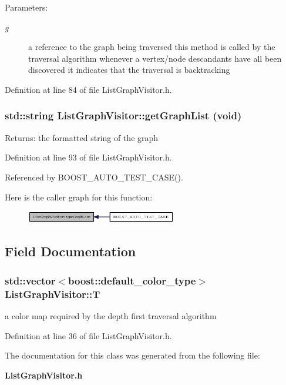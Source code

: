 \begin{Desc}
\item[Parameters:]
\begin{description}
\item[{\em g}]a reference to the graph being traversed this method is called by the traversal algorithm whenever a vertex/node descandants have all been discovered it indicates that the traversal is backtracking \end{description}
\end{Desc}


Definition at line 84 of file ListGraphVisitor.h.
\subsubsection{\setlength{\rightskip}{0pt plus 5cm}std::string ListGraphVisitor::getGraphList (void)\hspace{0.3cm}{\tt  [inline]}}\label{classListGraphVisitor_46a6ec7ac2284375c4ec816b5855c871}


\begin{Desc}
\item[Returns:]the formatted string of the graph \end{Desc}




Definition at line 93 of file ListGraphVisitor.h.

Referenced by BOOST\_\-AUTO\_\-TEST\_\-CASE().

Here is the caller graph for this function:\nopagebreak
\begin{figure}[H]
\begin{center}
\leavevmode
\includegraphics[width=186pt]{classListGraphVisitor_46a6ec7ac2284375c4ec816b5855c871_icgraph}
\end{center}
\end{figure}


\subsection{Field Documentation}
\subsubsection{\setlength{\rightskip}{0pt plus 5cm}std::vector$<$boost::default\_\-color\_\-type$>$ {\bf ListGraphVisitor::T}}\label{classListGraphVisitor_f0dbe8c9976400feef04e5cac95d0df1}


a color map required by the depth first traversal algorithm 



Definition at line 36 of file ListGraphVisitor.h.

The documentation for this class was generated from the following file:\begin{CompactItemize}
\item 
{\bf ListGraphVisitor.h}\end{CompactItemize}
